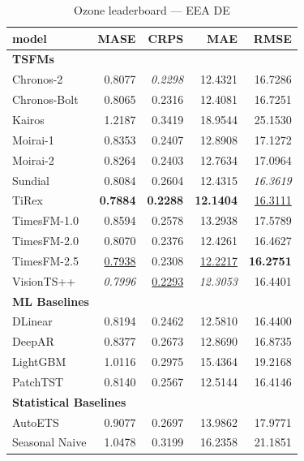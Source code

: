 \begin{table}[H]
\caption{Ozone leaderboard --- EEA DE}
\centering
\begin{small}
\begin{tabular}{lrrrr}
\toprule
model & MASE & CRPS & MAE & RMSE \\
\midrule
\multicolumn{5}{l}{\textbf{TSFMs}} \\
Chronos-2 & 0.8077 & \textit{0.2298} & 12.4321 & 16.7286 \\
Chronos-Bolt & 0.8065 & 0.2316 & 12.4081 & 16.7251 \\
Kairos & 1.2187 & 0.3419 & 18.9544 & 25.1530 \\
Moirai-1 & 0.8353 & 0.2407 & 12.8908 & 17.1272 \\
Moirai-2 & 0.8264 & 0.2403 & 12.7634 & 17.0964 \\
Sundial & 0.8084 & 0.2604 & 12.4315 & \textit{16.3619} \\
TiRex & \textbf{0.7884} & \textbf{0.2288} & \textbf{12.1404} & \underline{16.3111} \\
TimesFM-1.0 & 0.8594 & 0.2578 & 13.2938 & 17.5789 \\
TimesFM-2.0 & 0.8070 & 0.2376 & 12.4261 & 16.4627 \\
TimesFM-2.5 & \underline{0.7938} & 0.2308 & \underline{12.2217} & \textbf{16.2751} \\
VisionTS++ & \textit{0.7996} & \underline{0.2293} & \textit{12.3053} & 16.4401 \\
\midrule
\multicolumn{5}{l}{\textbf{ML Baselines}} \\
DLinear & 0.8194 & 0.2462 & 12.5810 & 16.4400 \\
DeepAR & 0.8377 & 0.2673 & 12.8690 & 16.8735 \\
LightGBM & 1.0116 & 0.2975 & 15.4364 & 19.2168 \\
PatchTST & 0.8140 & 0.2567 & 12.5144 & 16.4146 \\
\midrule
\multicolumn{5}{l}{\textbf{Statistical Baselines}} \\
AutoETS & 0.9077 & 0.2697 & 13.9862 & 17.9771 \\
Seasonal Naive & 1.0478 & 0.3199 & 16.2358 & 21.1851 \\
\bottomrule
\end{tabular}
\end{small}
\end{table}